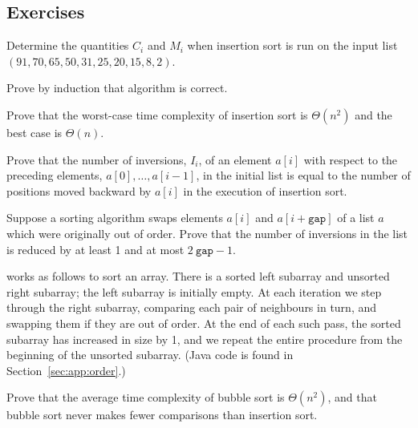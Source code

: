 \subsection*{Exercises}

\begin{Exercise}\label{exr:isort:inverse}
Determine the quantities $C_i$ and $M_i$ when insertion sort is run on the input
list \((91,70,65,50,31,25,20,15,8,2)\).  
\end{Exercise}

\begin{Exercise}\label{exr:isort2} Prove by induction that algorithm 
 is correct.
\end{Exercise}

\begin{Exercise}\label{exr:isort:max}
Prove that the worst-case time complexity of insertion sort is $\Theta(n^{2})$ 
and the best case is $\Theta(n)$.  
\end{Exercise}

\begin{Exercise}\label{exr:inversions}
Prove that the number of inversions, $I_{i}$, of an element \(a[i]\)
with respect to the preceding elements, \(a[0], \ldots, a[i-1]\), in the
initial list is equal to the number of positions moved backward by $a[i]$ 
in the execution of insertion sort.
\end{Exercise}  


\begin{Exercise}\label{exr:num:inversions} 
Suppose a sorting algorithm swaps elements  \(a[i]\) and 
\(a[i+ {\mathtt{gap}}]\) of a list \(a\) which were 
originally out of order.   
Prove that the number of inversions in the list is reduced by at
least 1 and at most \(2 \ {\mathtt{gap}} - 1\).            
\end{Exercise}


\begin{Exercise}\label{exr:bubblesort} 
 works as follows to sort an array. There is a sorted 
left subarray and unsorted right subarray; the left subarray is initially empty. 
At each iteration we step through the right subarray, comparing each pair of 
neighbours in turn, and swapping them if they are out of order. At the end of 
each such pass, the sorted subarray has increased in size by 1, and we repeat 
the entire procedure from the beginning of the unsorted subarray. (Java code is 
found in Section~\ref{sec:app:order}.)

Prove that the average time complexity of bubble sort is $\Theta(n^{2})$, and 
that bubble sort never makes fewer comparisons than insertion sort.

\end{Exercise}

